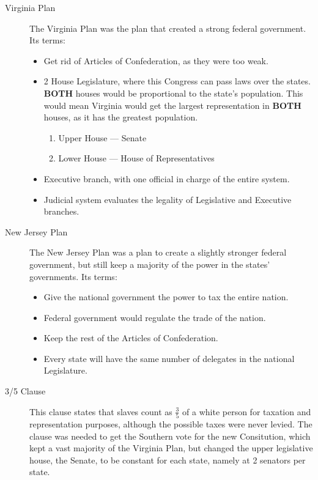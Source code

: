 \begin{description}
\item[Virginia Plan] The Virginia Plan was the plan that created a strong federal government.
  Its terms:
  \begin{itemize}[noitemsep]
  \item Get rid of Articles of Confederation, as they were too weak.
  \item 2 House Legislature, where this Congress can pass laws over the states.
    \textbf{BOTH} houses would be proportional to the state's population.
    This would mean Virginia would get the largest representation in \textbf{BOTH} houses, as it has the greatest population.
    \begin{enumerate}[noitemsep]
    \item Upper House --- Senate
    \item Lower House --- House of Representatives
    \end{enumerate}
  \item Executive branch, with one official in charge of the entire system.
  \item Judicial system evaluates the legality of Legislative and Executive branches.
  \end{itemize}

\item[New Jersey Plan] The New Jersey Plan was a plan to create a slightly stronger federal government, but still keep a majority of the power in the states' governments.
  Its terms:
  \begin{itemize}[noitemsep]
  \item Give the national government the power to tax the entire nation.
  \item Federal government would regulate the trade of the nation.
  \item Keep the rest of the Articles of Confederation.
  \item Every state will have the same number of delegates in the national Legislature.
  \end{itemize}

\item[3/5 Clause] This clause states that slaves count as $\frac{3}{5}$ of a white person for taxation and representation purposes, although the possible taxes were never levied.
  The clause was needed to get the Southern vote for the new Consitution, which kept a vast majority of the Virginia Plan, but changed the upper legislative house, the Senate, to be constant for each state, namely at 2 senators per state.


\end{description}
